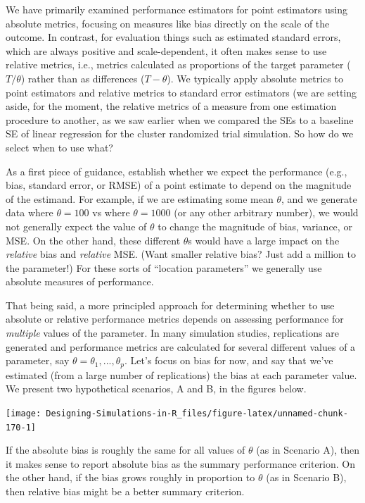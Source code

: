 \documentclass[
]{book}
\begin{document}
We have primarily examined performance estimators for point estimators using absolute metrics, focusing on measures like bias directly on the scale of the outcome.
In contrast, for evaluation things such as estimated standard errors, which are always positive and scale-dependent, it often makes sense to use relative metrics, i.e., metrics calculated as proportions of the target parameter (\(T/\theta\)) rather than as differences (\(T - \theta\)).
We typically apply absolute metrics to point estimators and relative metrics to standard error estimators (we are setting aside, for the moment, the relative metrics of a measure from one estimation procedure to another, as we saw earlier when we compared the SEs to a baseline SE of linear regression for the cluster randomized trial simulation.
So how do we select when to use what?

As a first piece of guidance, establish whether we expect the performance (e.g., bias, standard error, or RMSE) of a point estimate to depend on the magnitude of the estimand.
For example, if we are estimating some mean \(\theta\), and we generate data where \(\theta = 100\) vs where \(\theta = 1000\) (or any other arbitrary number), we would not generally expect the value of \(\theta\) to change the magnitude of bias, variance, or MSE.
On the other hand, these different \(\theta\)s would have a large impact on the \emph{relative} bias and \emph{relative} MSE.
(Want smaller relative bias? Just add a million to the parameter!)
For these sorts of ``location parameters'' we generally use absolute measures of performance.

That being said, a more principled approach for determining whether to use absolute or relative performance metrics depends on assessing performance for \emph{multiple} values of the parameter.
In many simulation studies, replications are generated and performance metrics are calculated for several different values of a parameter, say \(\theta = \theta_1,...,\theta_p\).
Let's focus on bias for now, and say that we've estimated (from a large number of replications) the bias at each parameter value.
We present two hypothetical scenarios, A and B, in the figures below.

\begin{center}\texttt{[image: Designing-Simulations-in-R\_files/figure-latex/unnamed-chunk-170-1]} \end{center}

If the absolute bias is roughly the same for all values of \(\theta\) (as in Scenario A), then it makes sense to report absolute bias as the summary performance criterion.
On the other hand, if the bias grows roughly in proportion to \(\theta\) (as in Scenario B), then relative bias might be a better summary criterion.
\end{document}
